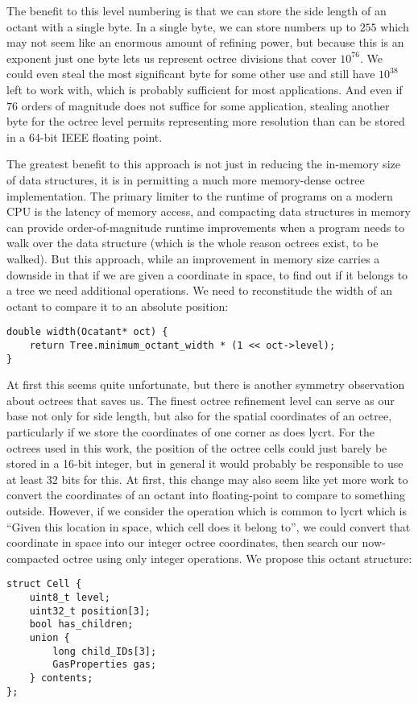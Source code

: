 The benefit to this level numbering is that we can store the side length of an octant with a single byte.
In a single byte, we can store numbers up to $255$ which may not seem like an enormous amount of refining power, but because this is an exponent just one byte lets us represent octree divisions that cover $10^{76}$.
We could even steal the most significant byte for some other use and still have $10^{38}$ left to work with, which is probably sufficient for most applications.
And even if $76$ orders of magnitude does not suffice for some application, stealing another byte for the octree level permits representing more resolution than can be stored in a 64-bit IEEE floating point.

The greatest benefit to this approach is not just in reducing the in-memory size of data structures, it is in permitting a much more memory-dense octree implementation.
The primary limiter to the runtime of programs on a modern CPU is the latency of memory access, and compacting data structures in memory can provide order-of-magnitude runtime improvements when a program needs to walk over the data structure (which is the whole reason octrees exist, to be walked).
But this approach, while an improvement in memory size carries a downside in that if we are given a coordinate in space, to find out if it belongs to a tree we need additional operations.
We need to reconstitude the width of an octant to compare it to an absolute position:
\begin{lstlisting}
double width(Ocatant* oct) {
    return Tree.minimum_octant_width * (1 << oct->level);
}
\end{lstlisting}

At first this seems quite unfortunate, but there is another symmetry observation about octrees that saves us.
The finest octree refinement level can serve as our base not only for side length, but also for the spatial coordinates of an octree, particularly if we store the coordinates of one corner as does {\sc lycrt}.
For the octrees used in this work, the position of the octree cells could just barely be stored in a 16-bit integer, but in general it would probably be responsible to use at least 32 bits for this.
At first, this change may also seem like yet more work to convert the coordinates of an octant into floating-point to compare to something outside.
However, if we consider the operation which is common to {\sc lycrt} which is ``Given this location in space, which cell does it belong to'', we could convert that coordinate in space into our integer octree coordinates, then search our now-compacted octree using only integer operations.
We propose this octant structure:
\begin{lstlisting}
struct Cell {
    uint8_t level;
    uint32_t position[3];
    bool has_children;
    union {
        long child_IDs[3];
        GasProperties gas;
    } contents;
};
\end{lstlisting}
